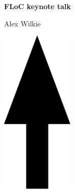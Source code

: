 \documentclass[a3paper]{article}
\begin{document}
\printGenericVSLHeaderBig
\begin{center}
\begin{vsltext}{3cm}{3.5cm}

    \vspace{1.5cm}

    \textbf{FLoC keynote talk} 

    Alex Wilkie

    \vspace{2cm}

    \includegraphics[height=8cm,keepaspectratio=true]{arrow_keynote.pdf}

\end{vsltext}

\end{center}
\end{document}
